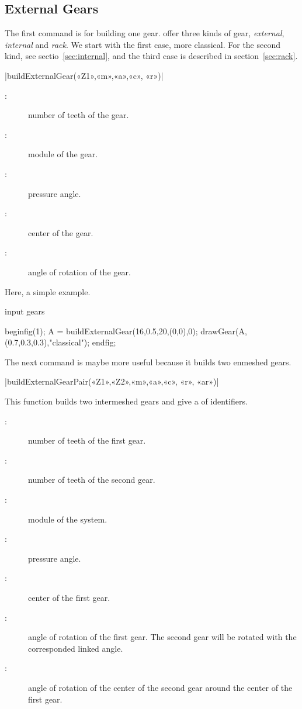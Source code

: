 \documentclass[english]{ltxdoc}
\begin{document}
\subsection{External Gears}

The first command is for building one gear. \mpgears offer three kinds of gear,
\emph{external}, \emph{internal} and \emph{rack}. We start with the first case,
more classical. For the second kind, see sectio~\ref{sec:internal}, and the
third case is described in section~\ref{sec:rack}.  

\begin{colourband}
\commande|buildExternalGear(«Z1»,«m»,«a»,«c», «r»)|\smallskip{}
\begin{description}
  \item[:]  number of teeth of the gear.
  \item[:]  module of the gear.
  \item[:]  pressure angle.
  \item[:]  center of the gear.
  \item[:]  angle of rotation of the gear.
\end{description}
\end{colourband}

Here, a simple example.
\begin{ExempleMP}
input gears

beginfig(1);
A = buildExternalGear(16,0.5,20,(0,0),0);
drawGear(A,(0.7,0.3,0.3),"classical");
endfig;
\end{ExempleMP}


The next command is maybe more useful because it builds two enmeshed gears.   

\begin{colourband}
\commande|buildExternalGearPair(«Z1»,«Z2»,«m»,«a»,«c», «r», «ar»)|\smallskip{}

This function builds two  intermeshed gears and give a  of 
identifiers. 
\begin{description}
  \item[:]  number of teeth of the first gear.
  \item[:]  number of teeth of the second gear.
  \item[:]  module of the system.
  \item[:]  pressure angle.
  \item[:]  center of the first gear.
  \item[:]  angle of rotation of the first gear.
  The second gear will be rotated with the corresponded linked angle. 
  \item[:]  angle of rotation of the center
  of the second gear around the center of the first gear.
\end{description}
\end{colourband}
\end{document}
